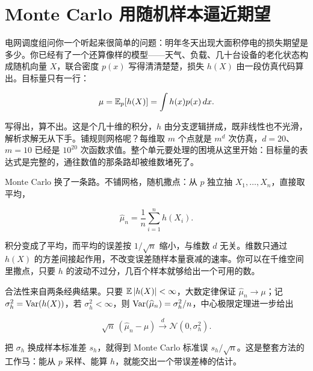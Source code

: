 \section{Monte Carlo 用随机样本逼近期望}
\label{sec:13-Machine-Learning/08-Sampling-and-Inference/01}

电网调度组问你一个听起来很简单的问题：明年冬天出现大面积停电的损失期望是多少。你已经有了一个还算像样的模型——天气、负载、几十台设备的老化状态构成随机向量 \(X\)，联合密度 \(p(x)\) 写得清清楚楚，损失 \(h(X)\) 由一段仿真代码算出。目标量只有一行：

\[
\mu=\mathbb{E}_p[h(X)]
=\int h(x)p(x)\,dx.
\]

写得出，算不出。这是个几十维的积分，\(h\) 由分支逻辑拼成，既非线性也不光滑，解析求解无从下手。铺规则网格呢？每维取 \(m\) 个点就是 \(m^d\) 次仿真，\(d=20\)、\(m=10\) 已经是 \(10^{20}\) 次函数求值。整个单元要处理的困境从这里开始：目标量的表达式是完整的，通往数值的那条路却被维数堵死了。

Monte Carlo 换了一条路。不铺网格，随机撒点：从 \(p\) 独立抽 \(X_1,\ldots,X_n\)，直接取平均，

\[
\widehat\mu_n
=\frac1n\sum_{i=1}^nh(X_i).
\]

积分变成了平均，而平均的误差按 \(1/\sqrt n\) 缩小，与维数 \(d\) 无关。维数只通过 \(h(X)\) 的方差间接起作用，不改变误差随样本量衰减的速率。你可以在千维空间里撒点，只要 \(h\) 的波动不过分，几百个样本就够给出一个可用的数。

合法性来自两条经典结果。只要 \(\mathbb{E}\left|h(X)\right|<\infty\)，大数定律保证 \(\widehat\mu_n\to\mu\)；记 \(\sigma_h^2=\operatorname{Var}(h(X))\)，若 \(\sigma_h^2<\infty\)，则 \(\operatorname{Var}(\widehat\mu_n)=\sigma_h^2/n\)，中心极限定理进一步给出

\[
\sqrt n\,(\widehat\mu_n-\mu)
\overset{d}{\longrightarrow}
\mathcal N(0,\sigma_h^2).
\]

把 \(\sigma_h\) 换成样本标准差 \(s_h\)，就得到 Monte Carlo 标准误 \(s_h/\sqrt n\)。这是整套方法的工作马：能从 \(p\) 采样、能算 \(h\)，就能交出一个带误差棒的估计。

\begin{center}
\end{center}

